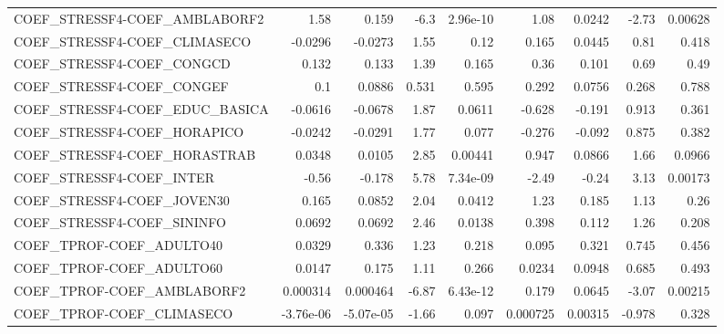 \begin{tabular}{lrrrrrrrr}
COEF\_STRESSF4-COEF\_AMBLABORF2         &        1.58 &        0.159 &     -6.3 & 2.96e-10 &       1.08 &      0.0242 &        -2.73 &       0.00628 \\
COEF\_STRESSF4-COEF\_CLIMASECO          &     -0.0296 &      -0.0273 &     1.55 &     0.12 &      0.165 &      0.0445 &         0.81 &         0.418 \\
COEF\_STRESSF4-COEF\_CONGCD             &       0.132 &        0.133 &     1.39 &    0.165 &       0.36 &       0.101 &         0.69 &          0.49 \\
COEF\_STRESSF4-COEF\_CONGEF             &         0.1 &       0.0886 &    0.531 &    0.595 &      0.292 &      0.0756 &        0.268 &         0.788 \\
COEF\_STRESSF4-COEF\_EDUC\_BASICA        &     -0.0616 &      -0.0678 &     1.87 &   0.0611 &     -0.628 &      -0.191 &        0.913 &         0.361 \\
COEF\_STRESSF4-COEF\_HORAPICO           &     -0.0242 &      -0.0291 &     1.77 &    0.077 &     -0.276 &      -0.092 &        0.875 &         0.382 \\
COEF\_STRESSF4-COEF\_HORASTRAB          &      0.0348 &       0.0105 &     2.85 &  0.00441 &      0.947 &      0.0866 &         1.66 &        0.0966 \\
COEF\_STRESSF4-COEF\_INTER              &       -0.56 &       -0.178 &     5.78 & 7.34e-09 &      -2.49 &       -0.24 &         3.13 &       0.00173 \\
COEF\_STRESSF4-COEF\_JOVEN30            &       0.165 &       0.0852 &     2.04 &   0.0412 &       1.23 &       0.185 &         1.13 &          0.26 \\
COEF\_STRESSF4-COEF\_SININFO            &      0.0692 &       0.0692 &     2.46 &   0.0138 &      0.398 &       0.112 &         1.26 &         0.208 \\
COEF\_TPROF-COEF\_ADULTO40              &      0.0329 &        0.336 &     1.23 &    0.218 &      0.095 &       0.321 &        0.745 &         0.456 \\
COEF\_TPROF-COEF\_ADULTO60              &      0.0147 &        0.175 &     1.11 &    0.266 &     0.0234 &      0.0948 &        0.685 &         0.493 \\
COEF\_TPROF-COEF\_AMBLABORF2            &    0.000314 &     0.000464 &    -6.87 & 6.43e-12 &      0.179 &      0.0645 &        -3.07 &       0.00215 \\
COEF\_TPROF-COEF\_CLIMASECO             &   -3.76e-06 &    -5.07e-05 &    -1.66 &    0.097 &   0.000725 &     0.00315 &       -0.978 &         0.328 \\

\end{tabular}
